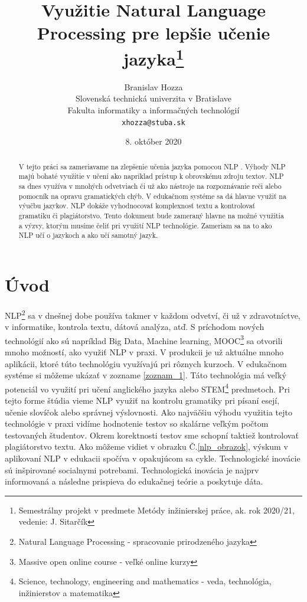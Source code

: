 \documentclass[10pt,twoside,slovak,a4paper]{article}
\title{Využitie Natural Language Processing pre lepšie učenie jazyka\thanks{Semestrálny projekt v predmete Metódy inžinierskej práce, ak. rok 2020/21, vedenie: J. Sitarčík}}
\author{Branislav Hozza\\[2pt]
	{\small Slovenská technická univerzita v Bratislave}\\
	{\small Fakulta informatiky a informačných technológií}\\
	{\small \texttt{xhozza@stuba.sk}}
	}
\date{\small 8. október 2020}
\begin{document}
\maketitle
\begin{abstract}
	V tejto práci sa zameriavame na zlepšenie učenia jazyka pomocou NLP \cite{litman2016natural}. 
	Výhody NLP majú bohaté využitie v učení ako napríklad prístup k obrovskému zdroju textov. 
	NLP sa dnes využíva v mnohých odvetviach či už ako nástroje na rozpoznávanie reči alebo pomocník na opravu gramatických chýb. 
	V edukačnom systéme sa dá hlavne využiť na výučbu jazykov. NLP dokáže vyhodnocovať komplexnosť textu a kontrolovať gramatiku či plagiátorstvo. 
	Tento dokument bude zameraný hlavne na možné využitia a výzvy, ktorým musíme čeliť pri využití NLP technológie. 
	Zameriam sa na to ako NLP učí o jazykoch a ako učí samotný jazyk.
\end{abstract}
\section{Úvod}
\begin{flushleft}
	NLP\footnote{Natural Language Processing - spracovanie prirodzeného jazyka} sa v dnešnej dobe používa takmer v každom odvetví, či už v zdravotníctve, v informatike, kontrola textu, dátová analýza, atď. 
S príchodom nových technológií ako sú napríklad Big Data, Machine learning, MOOC\footnote{Massive open online course - veľké online kurzy} sa otvorili mnoho možností, 
ako využiť NLP v praxi. V produkcii je už aktuálne mnoho aplikácii, ktoré túto technológiu využívajú pri rôznych kurzoch.
V edukačnom systéme si môžeme ukázať v zozname \ref{zoznam_1}. Táto technológia má veľký potenciál vo využití pri učení anglického jazyka 
alebo STEM\footnote{Science, technology, engineering and mathematics - veda, technológia, inžinierstov a matematika} predmetoch. 
Pri tejto forme štúdia vieme NLP využiť na kontrolu gramatiky pri písaní esejí, učenie slovíčok alebo správnej výslovnosti.
Ako najväčšiu výhodu využitia tejto technológie v praxi vidíme hodnotenie testov so skalárne veľkým počtom testovaných študentov. 
Okrem korektnosti testov sme schopní taktiež kontrolovať plagiátorstvo textu.\linebreak
Ako môžeme vidiet v obrazku Č.\ref{nlp_obrazok}, výskum v aplikovaní NLP v edukacii spočíva v opakujúcom sa cykle. 
Technologické inovácie sú inšpirované socialnymi potrebami. Technologická inovácia je najprv informovaná a následne prispieva 
do edukačnej teórie a poskytuje dáta.
\end{flushleft}
\end{document}
